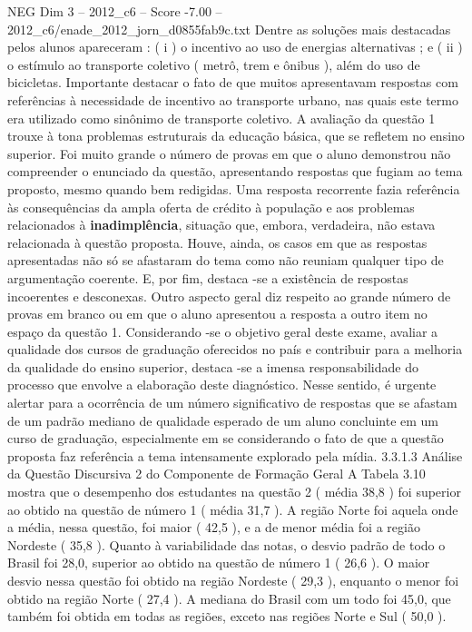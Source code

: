 \begin{textsample}{NEG Dim 3 – 2012\_c6 – Score -7.00 – 2012\_c6/enade\_2012\_jorn\_d0855fab9c.txt}
Dentre as soluções mais destacadas pelos alunos apareceram : ( i ) o incentivo ao uso de energias alternativas ; e ( ii ) o estímulo ao transporte coletivo ( metrô, trem e ônibus ), além do uso de bicicletas.
Importante destacar o fato de que muitos apresentavam respostas com referências à necessidade de incentivo ao transporte urbano, nas quais este termo era utilizado como sinônimo de transporte coletivo.
A avaliação da questão 1 trouxe à tona problemas estruturais da educação básica, que se refletem no ensino superior.
Foi muito grande o número de provas em que o aluno demonstrou não compreender o enunciado da questão, apresentando respostas que fugiam ao tema proposto, mesmo quando bem redigidas.
Uma resposta recorrente fazia referência às consequências da ampla oferta de crédito à população e aos problemas relacionados à \textbf{inadimplência}, situação que, embora, verdadeira, não estava relacionada à questão proposta.
Houve, ainda, os casos em que as respostas apresentadas não só se afastaram do tema como não reuniam qualquer tipo de argumentação coerente.
E, por fim, destaca -se a existência de respostas incoerentes e desconexas.
Outro aspecto geral diz respeito ao grande número de provas em branco ou em que o aluno apresentou a resposta a outro item no espaço da questão 1.
Considerando -se o objetivo geral deste exame, avaliar a qualidade dos cursos de graduação oferecidos no país e contribuir para a melhoria da qualidade do ensino superior, destaca -se a imensa responsabilidade do processo que envolve a elaboração deste diagnóstico.
Nesse sentido, é urgente alertar para a ocorrência de um número significativo de respostas que se afastam de um padrão mediano de qualidade esperado de um aluno concluinte em um curso de graduação, especialmente em se considerando o fato de que a questão proposta faz referência a tema intensamente explorado pela mídia. 3.3.1.3 Análise da Questão Discursiva 2 do Componente de Formação Geral A Tabela 3.10 mostra que o desempenho dos estudantes na questão 2 ( média 38,8 ) foi superior ao obtido na questão de número 1 ( média 31,7 ).
A região Norte foi aquela onde a média, nessa questão, foi maior ( 42,5 ), e a de menor média foi a região Nordeste ( 35,8 ).
Quanto à variabilidade das notas, o desvio padrão de todo o Brasil foi 28,0, superior ao obtido na questão de número 1 ( 26,6 ).
O maior desvio nessa questão foi obtido na região Nordeste ( 29,3 ), enquanto o menor foi obtido na região Norte ( 27,4 ).
A mediana do Brasil com um todo foi 45,0, que também foi obtida em todas as regiões, exceto nas regiões Norte e Sul ( 50,0 ).

\end{textsample}
